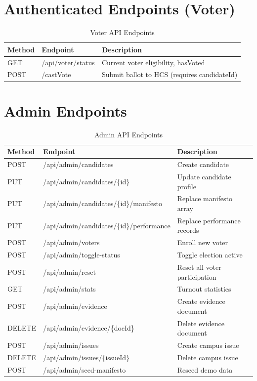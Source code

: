 \section{Authenticated Endpoints (Voter)}
\label{sec:voter-endpoints}

\begin{table}[H]
\centering
\caption{Voter API Endpoints}
\label{tab:voter-api}
\begin{tabular}{@{}lll@{}}
\toprule
\textbf{Method} & \textbf{Endpoint} & \textbf{Description} \\
\midrule
GET & /api/voter/status & Current voter eligibility, hasVoted \\
POST & /castVote & Submit ballot to HCS (requires candidateId) \\
\midrule
\end{tabular}
\end{table}

\section{Admin Endpoints}
\label{sec:app-admin-endpoints}

\begin{table}[H]
\centering
\caption{Admin API Endpoints}
\label{tab:admin-api}
\begin{tabular}{@{}lll@{}}
\toprule
\textbf{Method} & \textbf{Endpoint} & \textbf{Description} \\
\midrule
POST & /api/admin/candidates & Create candidate \\
PUT & /api/admin/candidates/\{id\} & Update candidate profile \\
PUT & /api/admin/candidates/\{id\}/manifesto & Replace manifesto array \\
PUT & /api/admin/candidates/\{id\}/performance & Replace performance records \\
POST & /api/admin/voters & Enroll new voter \\
POST & /api/admin/toggle-status & Toggle election active \\
POST & /api/admin/reset & Reset all voter participation \\
GET & /api/admin/stats & Turnout statistics \\
POST & /api/admin/evidence & Create evidence document \\
DELETE & /api/admin/evidence/\{docId\} & Delete evidence document \\
POST & /api/admin/issues & Create campus issue \\
DELETE & /api/admin/issues/\{issueId\} & Delete campus issue \\
POST & /api/admin/seed-manifesto & Reseed demo data \\
\midrule
\end{tabular}
\end{table}

